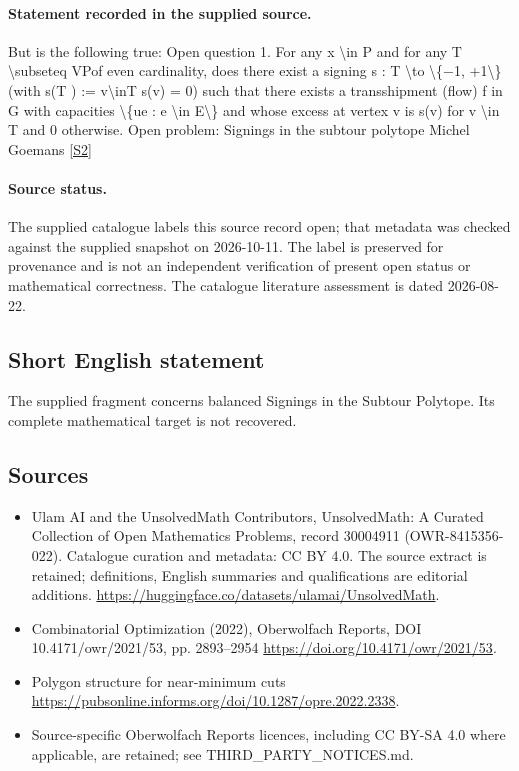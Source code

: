 \documentclass[11pt]{article}
\newcommand{\sref}[2]{\hyperlink{source:#1:#2}{[S#2]}}
\begin{document}
\paragraph{Statement recorded in the supplied source.}
But is the following true: Open question 1. For any x \textbackslash{}in P and for any T \textbackslash{}subseteq VPof even cardinality, does there exist a signing s : T \textbackslash{}to \textbackslash{}\{−1, +1\textbackslash{}\} (with s(T ) := v\textbackslash{}inT s(v) = 0) such that there exists a transshipment (flow) f in G with capacities \textbackslash{}\{ue : e \textbackslash{}in E\textbackslash{}\} and whose excess at vertex v is s(v) for v \textbackslash{}in T and 0 otherwise. Open problem: Signings in the subtour polytope Michel Goemans \sref{30004911}{2}
\paragraph{Source status.}
The supplied catalogue labels this source record open; that metadata was checked against the supplied snapshot on 2026-10-11. The label is preserved for provenance and is not an independent verification of present open status or mathematical correctness. The catalogue literature assessment is dated 2026-08-22.
\subsection{Short English statement}
The supplied fragment concerns balanced Signings in the Subtour Polytope. Its complete mathematical target is not recovered.
\subsection{Sources}
\begin{itemize}
\item[\hypertarget{source:30004911:1}{S1}] Ulam AI and the UnsolvedMath Contributors, UnsolvedMath: A Curated Collection of Open Mathematics Problems, record 30004911 (OWR-8415356-022). Catalogue curation and metadata: CC BY 4.0. The source extract is retained; definitions, English summaries and qualifications are editorial additions.
\url{https://huggingface.co/datasets/ulamai/UnsolvedMath}.
\item[\hypertarget{source:30004911:2}{S2}] Combinatorial Optimization (2022), Oberwolfach Reports, DOI 10.4171/owr/2021/53, pp. 2893--2954
\url{https://doi.org/10.4171/owr/2021/53}.
\item[\hypertarget{source:30004911:3}{S3}] Polygon structure for near-minimum cuts
\url{https://pubsonline.informs.org/doi/10.1287/opre.2022.2338}.
\item Source-specific Oberwolfach Reports licences, including CC BY-SA 4.0 where applicable, are retained; see THIRD\_PARTY\_NOTICES.md.
\end{itemize}
\end{document}
